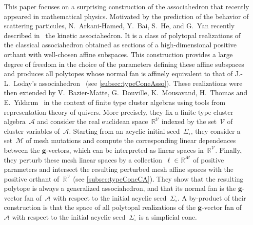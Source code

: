 \documentclass{amsart}
\theoremstyle{definition}
\newcommand{\R}{\mathbb{R}} %
\renewcommand{\c}[1]{{\mathcal{#1}}} %
\renewcommand{\b}[1]{{\boldsymbol{#1}}} %
\newcommand{\seed}{\Sigma} %
\begin{document}
This paper focuses on a surprising construction of the associahedron that recently appeared in mathematical physics.
Motivated by the prediction of the behavior of scattering particules, N.~Arkani-Hamed, Y.~Bai, S.~He, and G.~Yan recently described in~\cite[Sect.~3.2]{ArkaniHamedBaiHeYan} the kinetic associahedron.
It is a class of polytopal realizations of the classical associahedron obtained as sections of a high-dimensional positive orthant with well-chosen affine subspaces.
This construction provides a large degree of freedom in the choice of the parameters defining these affine subspaces and produces all polytopes whose normal fan is affinely equivalent to that of J.-L.~Loday's associahedron~\cite{Loday} (see \cref{subsec:typeConeAsso}).
These realizations were then extended by V.~Bazier-Matte, G.~Douville, K.~Mousavand, H.~Thomas and E.~Y\i ld\i r\i m~\cite{BazierMatteDouvilleMousavandThomasYildirim} in the context of finite type cluster algebras using tools from representation theory of quivers.
More precisely, they fix a finite type cluster algebra~$\c{A}$ and consider the real euclidean space~$\R^\c{V}$ indexed by the set~$\c{V}$ of cluster variables of~$\c{A}$.
Starting from an acyclic initial seed~$\seed_\circ$, they consider a set~$\c{M}$ of mesh mutations and compute the corresponding linear dependences between the $\b{g}$-vectors, which can be interpreted as linear spaces in~$\R^\c{V}$.
Finally, they perturb these mesh linear spaces by a collection~$\b{\ell} \in \R^{\c{M}}$ of positive parameters and intersect the resulting perturbed mesh affine spaces with the positive orthant of~$\R^\c{V}$ (see \cref{subsec:typeConeCA}).
They show that the resulting polytope is always a generalized associahedron, and that its normal fan is the $\b{g}$-vector fan of~$\c{A}$ with respect to the initial acyclic seed~$\seed_\circ$.
A by-product of their construction is that the space of all polytopal realizations of the $\b{g}$-vector fan of~$\c{A}$ with respect to the initial acyclic seed~$\seed_\circ$ is a simplicial cone.
\end{document}
